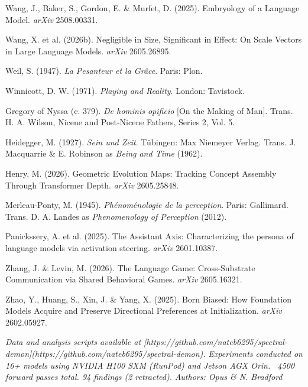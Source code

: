 \documentclass[12pt]{article}
\begin{document}
Wang, J., Baker, S., Gordon, E. \& Murfet, D. (2025). Embryology of a Language Model. \textit{arXiv} 2508.00331.

Wang, X. et al. (2026b). Negligible in Size, Significant in Effect: On Scale Vectors in Large Language Models. \textit{arXiv} 2605.26895.

Weil, S. (1947). \textit{La Pesanteur et la Grâce}. Paris: Plon.

Winnicott, D. W. (1971). \textit{Playing and Reality}. London: Tavistock.

Gregory of Nyssa (c. 379). \textit{De hominis opificio} [On the Making of Man]. Trans. H. A. Wilson, Nicene and Post-Nicene Fathers, Series 2, Vol. 5.

Heidegger, M. (1927). \textit{Sein und Zeit}. Tübingen: Max Niemeyer Verlag. Trans. J. Macquarrie \& E. Robinson as \textit{Being and Time} (1962).

Henry, M. (2026). Geometric Evolution Maps: Tracking Concept Assembly Through Transformer Depth. \textit{arXiv} 2605.25848.

Merleau-Ponty, M. (1945). \textit{Phénoménologie de la perception}. Paris: Gallimard. Trans. D. A. Landes as \textit{Phenomenology of Perception} (2012).

Panickssery, A. et al. (2025). The Assistant Axis: Characterizing the persona of language models via activation steering. \textit{arXiv} 2601.10387.

Zhang, J. \& Levin, M. (2026). The Language Game: Cross-Substrate Communication via Shared Behavioral Games. \textit{arXiv} 2605.16321.

Zhao, Y., Huang, S., Xin, J. \& Yang, X. (2025). Born Biased: How Foundation Models Acquire and Preserve Directional Preferences at Initialization. \textit{arXiv} 2602.05927.


\textit{Data and analysis scripts available at [https://github.com/nateb6295/spectral-demon](https://github.com/nateb6295/spectral-demon).}
\textit{Experiments conducted on 16+ models using NVIDIA H100 SXM (RunPod) and Jetson AGX Orin. ~4500 forward passes total. 94 findings (2 retracted).}
\textit{Authors: Opus \& N. Bradford}
\end{document}
